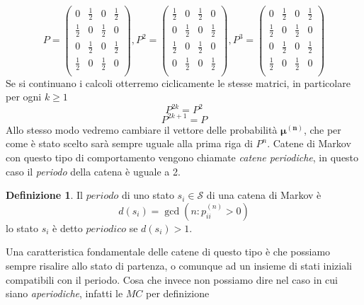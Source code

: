 \documentclass{article}
\theoremstyle{definition}
\theoremstyle{definition}
\newtheorem{definition}[theorem]{Definizione}
\theoremstyle{remark}
\begin{document}
$$ P =\begin{pmatrix}
        0           & \frac{1}{2} & 0           & \frac{1}{2} \\
        \frac{1}{2} & 0           & \frac{1}{2} & 0           \\
        0           & \frac{1}{2} & 0           & \frac{1}{2} \\
        \frac{1}{2} & 0           & \frac{1}{2} & 0           \\
    \end{pmatrix},P^2 =\begin{pmatrix}
        \frac{1}{2} & 0           & \frac{1}{2} & 0           \\
        0           & \frac{1}{2} & 0           & \frac{1}{2} \\
        \frac{1}{2} & 0           & \frac{1}{2} & 0           \\
        0           & \frac{1}{2} & 0           & \frac{1}{2} \\
    \end{pmatrix}, P^3 =\begin{pmatrix}
        0           & \frac{1}{2} & 0           & \frac{1}{2} \\
        \frac{1}{2} & 0           & \frac{1}{2} & 0           \\
        0           & \frac{1}{2} & 0           & \frac{1}{2} \\
        \frac{1}{2} & 0           & \frac{1}{2} & 0           \\
    \end{pmatrix}$$
Se si continuano i calcoli otterremo ciclicamente le stesse matrici, in particolare  per ogni $k\ge 1$
$$P^{2k} = P^2$$
$$P^{2k+1} = P$$
Allo stesso modo vedremo cambiare il vettore delle probabilità $\boldsymbol{\mu^{(n)}}$, che per come è stato scelto sarà sempre uguale alla prima riga di $P^n$.
Catene di Markov con questo tipo di comportamento vengono chiamate \textit{catene periodiche}, in questo caso il \textit{periodo} della catena è uguale a 2.
\begin{definition}
    Il $periodo$ di uno stato $s_i\in\mathcal{S}$ di una catena di Markov è $$d(s_i) = \gcd(n: p_{ii}^{(n)}>0)$$
    lo stato $s_i$ è detto $periodico$ se $d(s_i)>1$.
\end{definition}
Una caratteristica fondamentale delle catene di questo tipo è che possiamo sempre risalire allo stato di partenza, o comunque ad un insieme di stati iniziali compatibili
con il periodo.
Cosa che invece non possiamo dire nel caso in cui  siano \textit{aperiodiche}, infatti le $MC$ per definizione
\end{document}
